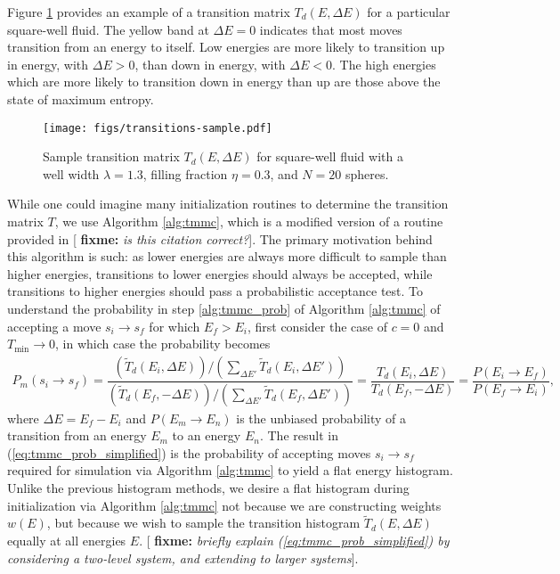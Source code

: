 \documentclass[11pt]{article}
\renewcommand{\t}{\text} %
\newcommand{\f}[2]{\dfrac{#1}{#2}} %
\newcommand{\p}[1]{\left(#1\right)} %
\newcommand{\red}[1]{{\bf \color{red} #1}}
\newcommand{\fixme}[1]{[\red{fixme:} \emph{#1}]}
\begin{document}
Figure \ref{fig:transitions_sample} provides an example of a
transition matrix $T_d\p{E,\Delta E}$ for a particular square-well
fluid. The yellow band at $\Delta E=0$ indicates that most moves
transition from an energy to itself. Low energies are more likely to
transition up in energy, with $\Delta E>0$, than down in energy, with
$\Delta E<0$. The high energies which are more likely to transition
down in energy than up are those above the state of maximum entropy.

\begin{figure}
  \centering
  \texttt{[image: figs/transitions-sample.pdf]}
  \caption[Sample transition matrix]{Sample transition matrix
    $T_d\p{E,\Delta E}$ for square-well fluid with a well width
    $\lambda=1.3$, filling fraction $\eta=0.3$, and $N=20$ spheres.}
  \label{fig:transitions_sample}
\end{figure}

While one could imagine many initialization routines to determine the
transition matrix $T$, we use Algorithm \ref{alg:tmmc}, which is a
modified version of a routine provided in \cite{tmmc_prl}\fixme{is
  this citation correct?}. The primary motivation behind this
algorithm is such: as lower energies are always more difficult to
sample than higher energies, transitions to lower energies should
always be accepted, while transitions to higher energies should pass a
probabilistic acceptance test. To understand the probability in step
\ref{alg:tmmc_prob} of Algorithm \ref{alg:tmmc} of accepting a move
$s_i\to s_f$ for which $E_f>E_i$, first consider the case of $c=0$ and
$T_{\t{min}}\to0$, in which case the probability becomes
\begin{align}
  P_m\p{s_i\to s_f}=\f{\p{\tilde T_d\p{E_i,\Delta E}}\big/
    \p{\sum_{\Delta E'}\tilde T_d\p{E_i,\Delta E'}}} {\p{\tilde
      T_d\p{E_f,-\Delta E}}\big/ \p{\sum_{\Delta E'}\tilde
      T_d\p{E_f,\Delta E'}}} =\f{T_d\p{E_i,\Delta
      E}}{T_d\p{E_f,-\Delta E}} =\f{P\p{E_i\to E_f}}{P\p{E_f\to E_i}},
  \label{eq:tmmc_prob_simplified}
\end{align}
where $\Delta E=E_f-E_i$ and $P\p{E_m\to E_n}$ is the unbiased
probability of a transition from an energy $E_m$ to an energy
$E_n$. The result in (\ref{eq:tmmc_prob_simplified}) is the
probability of accepting moves $s_i\to s_f$ required for simulation
via Algorithm \ref{alg:tmmc} to yield a flat energy
histogram\cite{tmmc}. Unlike the previous histogram methods, we desire
a flat histogram during initialization via Algorithm \ref{alg:tmmc}
not because we are constructing weights $w\p{E}$, but because we wish
to sample the transition histogram $\tilde T_d\p{E,\Delta E}$ equally
at all energies $E$. \fixme{briefly explain
  (\ref{eq:tmmc_prob_simplified}) by considering a two-level system,
  and extending to larger systems}.
\end{document}
